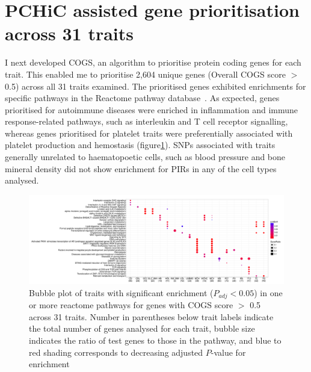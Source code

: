 \documentclass[a4paper,11pt]{report}
\begin{document}
\section{PCHiC assisted gene prioritisation across 31 traits}
 
I next developed COGS, an algorithm to prioritise protein coding genes for each trait. This enabled me to prioritise 2,604  unique genes (Overall COGS score $>$ 0.5) across all 31 traits examined. The prioritised genes exhibited enrichments for specific pathways in the Reactome pathway database~\citep{FabregatSidiropoulosGarapatiEtAl2016}. As expected, genes prioritised for autoimmune diseases were enriched in inflammation and immune response-related pathways, such as interleukin and T cell receptor signalling, whereas genes prioritised for platelet traits were preferentially associated with platelet production and hemostasis (figure\ref{fig:reactome}). SNPs associated with traits generally unrelated to haematopoetic cells, such as blood pressure and bone mineral density did not show enrichment for PIRs in any of the cell types analysed. 

\begin{figure}[h]
\includegraphics[width=\textwidth]{hyper_reactome_analysis_2.pdf}
\caption{Bubble plot of traits with significant enrichment ($P_{adj} < 0.05$) in one or more reactome pathways  for genes with COGS score $>$ 0.5 across 31 traits. Number in parentheses below trait labels indicate the total number of genes analysed for each trait, bubble size indicates the ratio of test genes to those in the pathway, and blue to red shading corresponds to decreasing adjusted $P$-value for enrichment}
\label{fig:reactome}
\end{figure}


\end{document}
